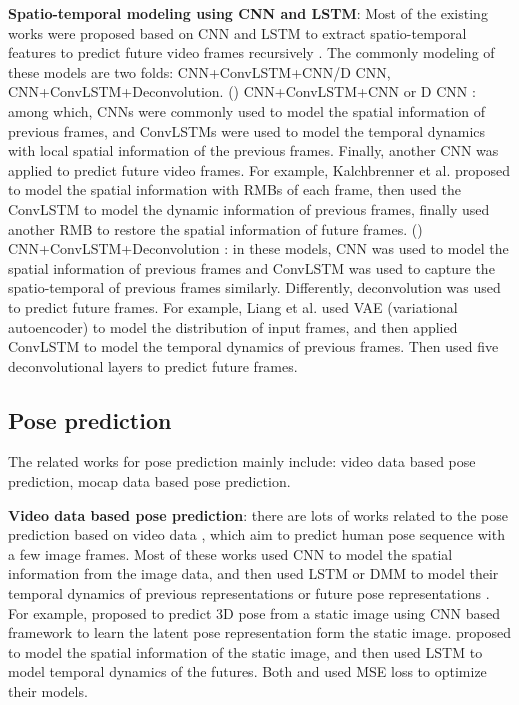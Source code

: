 \documentclass[journal]{IEEEtran}
\begin{document}
{\bf Spatio-temporal modeling using CNN and LSTM}: Most of the existing works were proposed based on CNN and LSTM to extract spatio-temporal features to predict future video frames recursively \cite{acvpag,dmf2vp,savp,sv2p,fstvp,spvp,dgvp,dpcvpul,vpn,ld2rvp,dmcnvsp}. The commonly modeling of these models are two folds: CNN+ConvLSTM+CNN/D CNN, CNN+ConvLSTM+Deconvolution. () CNN+ConvLSTM+CNN or D CNN \cite{savp,sv2p,fstvp,spvp,dgvp,dpcvpul,vpn}: among which, CNNs were commonly used to model the spatial information of previous frames, and ConvLSTMs were used to model the temporal dynamics with local spatial information of the previous frames. Finally, another CNN was applied to predict future video frames. For example, Kalchbrenner et al. \cite{vpn} proposed to model the spatial information with RMBs  of each frame, then used the ConvLSTM to model the dynamic information of previous frames, finally used another RMB to restore the spatial information of future frames. () CNN+ConvLSTM+Deconvolution \cite{acvpag,dmf2vp,ld2rvp,dmcnvsp}: in these models, CNN was used to model the spatial information of previous frames and ConvLSTM was used to capture the spatio-temporal of previous frames similarly. Differently, deconvolution was used to predict future frames. For example, Liang et al. \cite{dmf2vp} used VAE (variational autoencoder) to model the distribution of input frames, and then applied ConvLSTM to model the temporal dynamics of previous frames. Then used five deconvolutional layers to predict future frames.


\subsection{Pose prediction}

The related works for pose prediction mainly include: video data based pose prediction, mocap data based pose prediction.

{\bf Video data based pose prediction}: there are lots of works related to the pose prediction based on video data \cite{CaiDVG,pkvf,pfdmm,PFN3D,sp2dnn,mdmfp,rmpof}, which aim to predict human pose sequence with a few image frames. Most of these works used CNN to model the spatial information from the image data, and then used LSTM or DMM to model their temporal dynamics of previous representations or future pose representations \cite{pkvf,pfdmm,PFN3D,rmpof}. For example, \cite{sp2dnn} proposed to predict 3D pose from a static image using CNN based framework to learn the latent pose representation form the static image. \cite{PFN3D} proposed to model the spatial information of the static image, and then used LSTM to model temporal dynamics of the futures. Both \cite{PFN3D} and \cite{sp2dnn} used MSE loss to optimize their models.
\end{document}
